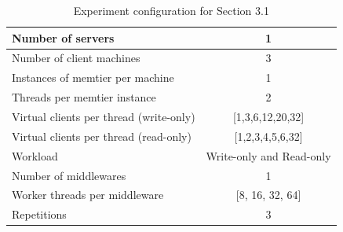 \documentclass[11pt,a4paper]{article}
\begin{document}
\begin{center}
	\begin{table}
		\begin{tabular}{|l|c|}
			\hline Number of servers                & 1                        \\ 
			\hline Number of client machines        & 3                        \\ 
			\hline Instances of memtier per machine & 1                        \\ 
			\hline Threads per memtier instance     & 2                        \\
			\hline Virtual clients per thread (write-only)  & [1,3,6,12,20,32] \\ 
			\hline Virtual clients per thread (read-only)   & [1,2,3,4,5,6,32] \\ 
			\hline Workload                         & Write-only and Read-only \\
			\hline Number of middlewares            & 1                        \\
			\hline Worker threads per middleware    & [8, 16, 32, 64]          \\
			\hline Repetitions                      & 3                        \\ 
			\hline 
		\end{tabular}
		\caption{Experiment configuration for Section 3.1} \label{exp3-1}
	\end{table}
\end{center}
\end{document}
